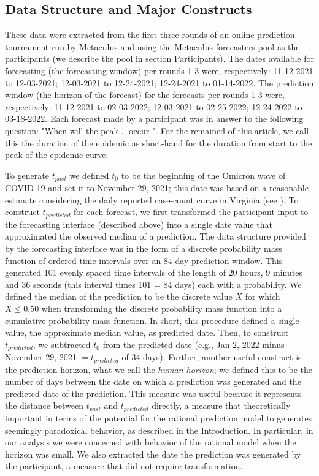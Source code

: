 \subsection{Data Structure and Major Constructs}\label{data-structure}
These data were extracted from the first three rounds of an online prediction tournament run by Metaculus and using the Metaculus forecasters pool as the participants (we describe the pool in section Participants).  The dates available for forecasting (the forecasting window) per rounds 1-3 were, respectively: 11-12-2021 to 12-03-2021; 12-03-2021 to 12-24-2021; 12-24-2021 to 01-14-2022.  The prediction window (the horizon of the forecast) for the forecasts per rounds 1-3 were, respectively: 11-12-2021 to 02-03-2022; 12-03-2021 to 02-25-2022; 12-24-2022 to 03-18-2022.  Each forecast made by a participant was in answer to the following question:  "When will the peak .. occur ". For the remained of this article, we call this the duration of the epidemic as short-hand for the duration from start to the peak of the epidemic curve. 

To generate $t_{past}$ we defined $t_0$ to be the beginning of the Omicron wave of COVID-19 and set it to November 29, 2021; this date was based on a reasonable estimate considering the daily reported case-count curve in Virginia (see \cite{VDHOnline}).  To construct $t_{predicted}$ for each forecast, we first transformed the participant input to the forecasting interface (described above) into a single date value that approximated the observed median of a prediction.  The data structure provided by the forecasting interface was in the form of a discrete probability mass function of ordered time intervals over an 84 day prediction window.  This generated 101 evenly spaced time intervals of the length of 20 hours, 9 minutes and 36 seconds (this interval times 101 = 84 days) each with a probability.  We defined the median of the prediction to be the discrete value $X$ for which $X \le 0.50$ when transforming the discrete probability mass function into a cumulative probability mass function.  In short, this procedure defined a single value, the approximate median value, as predicted date. Then, to construct $t_{predicted}$, we subtracted $t_0$ from the predicted date (e.g., Jan 2, 2022 minus November 29, 2021 $= t_{predicted}$ of 34 days).  Further, another useful construct is the prediction horizon, what we call the \textit{human horizon}; we defined this to be the number of days between the date on which a prediction was generated and the predicted date of the prediction.  This measure was useful because it represents the distance between $t_{past}$ and $t_{predicted}$ directly, a measure that theoretically important in terms of the potential for the rational prediction model to generates seemingly paradoxical behavior, as described in the Introduction.  In particular, in our analysis we were concerned with behavior of the rational model when the horizon was small.  We also extracted the date the prediction was generated by the participant, a measure that did not require transformation.

